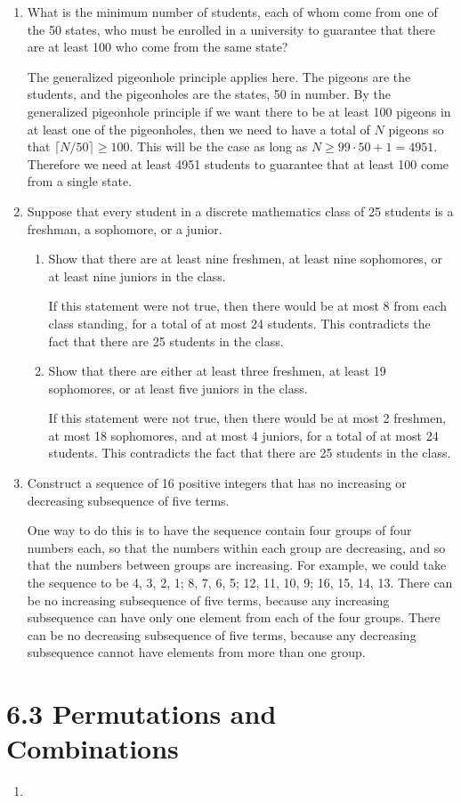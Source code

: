 \documentclass[11pt]{article}
\begin{document}
\begin{enumerate}[label=\textbf{\arabic*.}]
	\item What is the minimum number of students, each of whom come from one of the 50 states, who must be enrolled in a university to guarantee that there are at least 100 who come from the same state?
	
	The generalized pigeonhole principle applies here. The pigeons are the students, and the pigeonholes are the states, 50 in number. By the generalized pigeonhole principle if we want there to be at least 100 pigeons in at least one of the pigeonholes, then we need to have a total of $N$ pigeons so that $\lceil N / 50 \rceil \geq 100$. This will be the case as long as $N \geq 99 \cdot 50 + 1 = 4951$. Therefore we need at least 4951 students to guarantee that at least 100 come from a single state.
	
	\item Suppose that every student in a discrete mathematics class of 25 students is a freshman, a sophomore, or a junior.
	
	\begin{enumerate}[label=\textbf{\alph*)}]
		\item Show that there are at least nine freshmen, at least nine sophomores, or at least nine juniors in the class.
		
		If this statement were not true, then there would be at most 8 from each class standing, for a total of at most 24 students. This contradicts the fact that there are 25 students in the class.
		
		\item Show that there are either at least three freshmen, at least 19 sophomores, or at least five juniors in the class.
		
		If this statement were not true, then there would be at most 2 freshmen, at most 18 sophomores, and at most 4 juniors, for a total of at most 24 students. This contradicts the fact that there are 25 students in the class.
	\end{enumerate}

	\item Construct a sequence of 16 positive integers that has no increasing or decreasing subsequence of five terms.
	
	One way to do this is to have the sequence contain four groups of four numbers each, so that the numbers within each group are decreasing, and so that the numbers between groups are increasing. For example, we could take the sequence to be 4, 3, 2, 1; 8, 7, 6, 5; 12, 11, 10, 9; 16, 15, 14, 13. There can be no increasing subsequence of five terms, because any increasing subsequence can have only one element from each of the four groups. There can be no decreasing subsequence of five terms, because any decreasing subsequence cannot have elements from more than one group.
\end{enumerate}

\section*{\textbf{6.3 Permutations and Combinations}}
\begin{enumerate}[label=\textbf{\arabic*.}]
	\item 
\end{enumerate}
\end{document}
